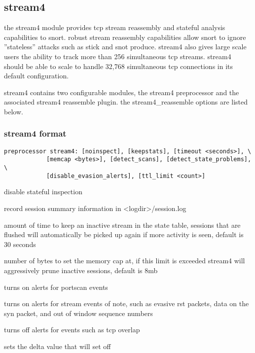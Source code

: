 \documentclass[english]{report}
\begin{document}
\subsection{stream4\label{stream 4 section}}

the stream4 module provides tcp stream reassembly and stateful analysis
capabilities to snort. robust stream reassembly capabilities allow
snort to ignore ''stateless'' attacks such as stick and snot produce.
stream4 also gives large scale users the ability to track more than
256 simultaneous tcp streams. stream4 should be able to scale to handle
32,768 simultaneous tcp connections in its default configuration.

stream4 contains two configurable modules, the stream4 preprocessor
and the associated stream4 reassemble plugin. the stream4\_reassemble
options are listed below. 


\subsubsection{stream4 format}

\begin{verbatim}
preprocessor stream4: [noinspect], [keepstats], [timeout <seconds>], \
            [memcap <bytes>], [detect_scans], [detect_state_problems], \
            [disable_evasion_alerts], [ttl_limit <count>]
\end{verbatim}
\begin{description}{}
\item [noinspect]disable stateful inspection
\item [keepstats]record session summary information in <logdir>/session.log
\item [timeout~<seconds>]amount of time to keep an inactive stream in
the state table, sessions that are flushed will automatically be picked
up again if more activity is seen, default is 30 seconds
\item [memcap~<bytes>]number of bytes to set the memory cap at, if this
limit is exceeded stream4 will aggressively prune inactive sessions,
default is 8mb
\item [detect\_scans]turns on alerts for portscan events
\item [detect\_state\_problems]turns on alerts for stream events of note,
such as evasive rst packets, data on the syn packet, and out of window
sequence numbers
\item [disable\_evasion\_alerts]turns off alerts for events such as tcp
overlap
\item [ttl\_limit]sets the delta value that will set off 
\end{description}
\end{document}
